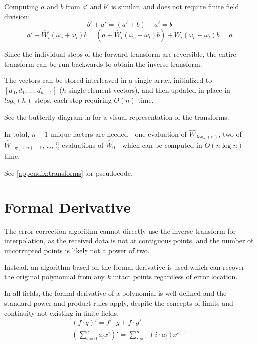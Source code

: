 Computing $a$ and $b$ from $a'$ and $b'$ is similar, and does not require finite field division:
\begin{equation}b' + a' = (a' + b) + a' = b\end{equation}
\begin{equation}a' + \hat{W}_i(\omega_c + \omega_l) b = (a + \hat{W}_i(\omega_c + \omega_l) b) + \hat{W}_i(\omega_c + \omega_l) b = a\end{equation}

Since the individual steps of the forward transform are reversible, the entire transform can be run backwards to obtain the inverse transform.

The vectors can be stored interleaved in a single array, initialized to $[d_0, d_1, \ldots, d_{h - 1}]$ ($h$ single-element vectors), and then updated in-place in $log_2(h)$ steps, each step requiring $O(n)$ time.

See the butterfly diagram in \cite{novel-poly} for a visual representation of the transforms.

In total, $n - 1$ unique factors are needed - one evaluation of $\hat{W}_{\log_2(n)}$, two of $\hat{W}_{\log_2(n) - 1}$, \ldots, $\frac{n}{2}$ evaluations of $\hat{W}_0$ - which can be computed in $O(n \log n)$ time.

See \ref{appendix:transforms} for pseudocode.

\section{Formal Derivative}

The error correction algorithm cannot directly use the inverse transform for interpolation, as the received data is not at contiguous points, and the number of uncorrupted points is likely not a power of two.

Instead, an algorithm based on the formal derivative is used which can recover the original polynomial from any $k$ intact points regardless of error location.

In all fields, the formal derivative of a polynomial is well-defined and the standard power and product rules apply, despite the concepts of limits and continuity not existing in finite fields.
\begin{gather*}
(f \cdot g)' = f' \cdot g + f \cdot g'\\
(\sum_{i = 0}^{n} a_i x^i)' = \sum_{i = 1}^{n} (i \cdot a_i) x^{i - 1}
\end{gather*}

